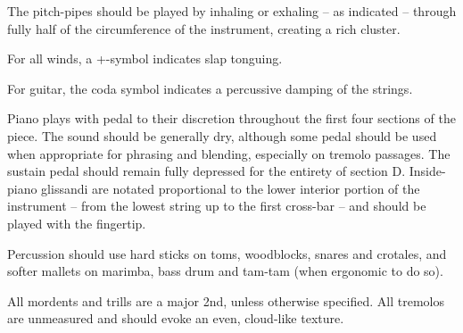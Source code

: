 \documentclass[10pt]{article}
\begin{document}
\begin{textblock}{11}
The pitch-pipes should be played by inhaling or exhaling -- as indicated --
through fully half of the circumference of the instrument, creating a rich
cluster.

For all winds, a +-symbol indicates slap tonguing.

For guitar, the coda symbol indicates a percussive damping of the strings.

Piano plays with pedal to their discretion throughout the first four sections
of the piece. The sound should be generally dry, although some pedal should be
used when appropriate for phrasing and blending, especially on tremolo
passages. The sustain pedal should remain fully depressed for the entirety of
section D. Inside-piano glissandi are notated proportional to the lower
interior portion of the instrument -- from the lowest string up to the first
cross-bar -- and should be played with the fingertip.

Percussion should use hard sticks on toms, woodblocks, snares and crotales, and
softer mallets on marimba, bass drum and tam-tam (when ergonomic to do so).

All mordents and trills are a major 2nd, unless otherwise specified. All
tremolos are unmeasured and should evoke an even, cloud-like texture.

\end{textblock}
\end{document}
